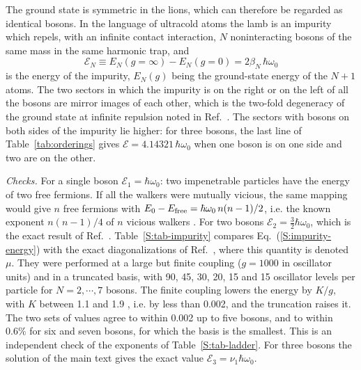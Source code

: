 The ground state is symmetric in the lions, which can therefore be regarded as identical bosons. In the language of ultracold atoms the lamb is an impurity which repels, with an infinite contact interaction, $N$ noninteracting bosons of the same mass in the same harmonic trap, and
\begin{equation} \label{S:impurity-energy}
    \mathcal{E}_N \equiv E_N(g = \infty) - E_N(g = 0) = 2 \beta_N \, \hbar \omega_0
\end{equation}
is the energy of the impurity, $E_N(g)$ being the ground-state energy of the $N + 1$ atoms. The two sectors in which the impurity is on the right or on the left of all the bosons are mirror images of each other, which is the two-fold degeneracy of the ground state at infinite repulsion noted in Ref.~\cite{DVZ15}. The sectors with bosons on both sides of the impurity lie higher: for three bosons, the last line of Table~\ref{tab:orderings} gives $\mathcal{E} = 4.14321 \, \hbar \omega_0$ when one boson is on one side and two are on the other.

\emph{Checks.} For a single boson $\mathcal{E}_1 = \hbar \omega_0$: two impenetrable particles have the energy of two free fermions. If all the walkers were mutually vicious, the same mapping would give $n$ free fermions with $E_0 - E_{\rm free} = \hbar \omega_0 \, n (n-1)/2$, i.e. the known exponent $n (n-1)/4$ of $n$ vicious walkers \cite{Fisher84,HF84}. For two bosons $\mathcal{E}_2 = \frac{3}{2} \hbar \omega_0$, which is the exact result of Ref.~\cite{ZVFJV14}. Table~\ref{S:tab-impurity} compares Eq.~(\ref{S:impurity-energy}) with the exact diagonalizations of Ref.~\cite{RIJ24}, where this quantity is denoted $\mu$. They were performed at a large but finite coupling ($g = 1000$ in oscillator units) and in a truncated basis, with 90, 45, 30, 20, 15 and 15 oscillator levels per particle for $N = 2, \cdots, 7$ bosons. The finite coupling lowers the energy by $K/g$, with $K$ between 1.1 and 1.9 \cite{RIJ24}, i.e. by less than 0.002, and the truncation raises it. The two sets of values agree to within 0.002 up to five bosons, and to within $0.6\%$ for six and seven bosons, for which the basis is the smallest. This is an independent check of the exponents of Table~\ref{S:tab-ladder}. For three bosons the solution of the main text gives the exact value $\mathcal{E}_3 = \nu_1 \hbar \omega_0$.

